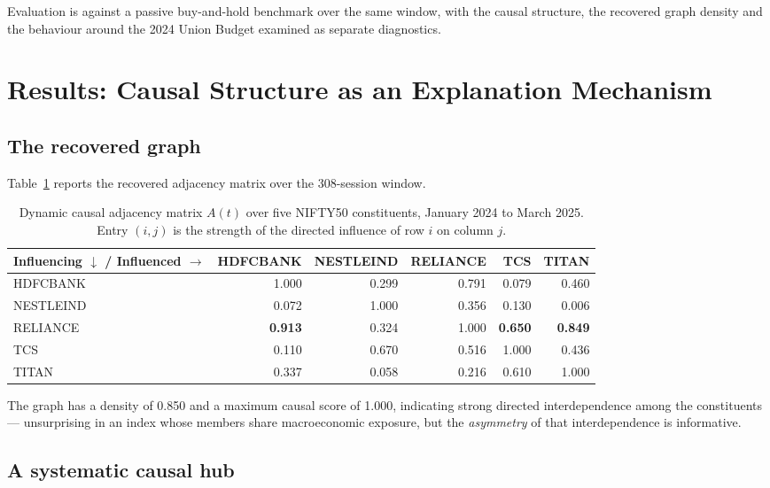 Evaluation is against a passive buy-and-hold benchmark over the same window, with the causal
structure, the recovered graph density and the behaviour around the 2024 Union Budget examined as
separate diagnostics.

\section{Results: Causal Structure as an Explanation Mechanism}
\label{sec:dchf-causal}

\subsection{The recovered graph}

Table~\ref{tab:causal} reports the recovered adjacency matrix over the 308-session window.

\begin{table}[!htb]
\centering
\caption[Dynamic causal adjacency matrix]{Dynamic causal adjacency matrix $A(t)$ over five
NIFTY50 constituents, January 2024 to March 2025. Entry $(i,j)$ is the strength of the directed
influence of row $i$ on column $j$.}
\label{tab:causal}
\tabfont
\begin{tabular}{@{}lrrrrr@{}}
\toprule
\textbf{Influencing $\downarrow$ / Influenced $\rightarrow$} & \textbf{HDFCBANK} &
\textbf{NESTLEIND} & \textbf{RELIANCE} & \textbf{TCS} & \textbf{TITAN} \\
\midrule
HDFCBANK  & 1.000 & 0.299 & 0.791 & 0.079 & 0.460 \\
NESTLEIND & 0.072 & 1.000 & 0.356 & 0.130 & 0.006 \\
RELIANCE  & \textbf{0.913} & 0.324 & 1.000 & \textbf{0.650} & \textbf{0.849} \\
TCS       & 0.110 & 0.670 & 0.516 & 1.000 & 0.436 \\
TITAN     & 0.337 & 0.058 & 0.216 & 0.610 & 1.000 \\
\bottomrule
\end{tabular}
\end{table}

The graph has a density of 0.850 and a maximum causal score of 1.000, indicating strong directed
interdependence among the constituents --- unsurprising in an index whose members share
macroeconomic exposure, but the \emph{asymmetry} of that interdependence is informative.

\subsection{A systematic causal hub}

